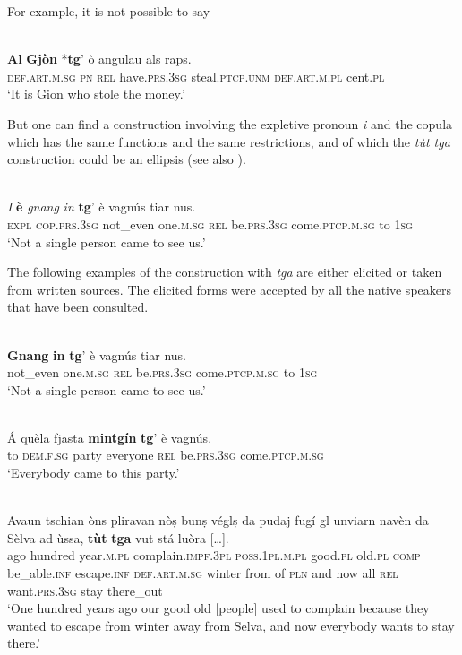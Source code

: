 For example, it is not possible to say

\ea\label{}
\\
\gll \textbf{Al} \textbf{Gjòn} *\textbf{tg}' ò angulau als raps.\\
\textsc{def.art.m.sg} \textsc{pn} \textsc{rel} have.\textsc{prs.3sg} steal.\textsc{ptcp.unm} \textsc{def.art.m.pl} cent.\textsc{pl}\\
\glt `It is Gion who stole the money.'
\z

But one can find a construction involving the expletive pronoun \textit{i} and the copula which has the same functions and the same restrictions, and of which the \textit{tùt tga} construction could be an ellipsis (see also  \citet[201]{Linder1987}).

\ea\label{}
\\
\gll \textit{I} \textbf{è} \textit{gnang} \textit{in} \textbf{tg}' è vagnús tiar nus.\\
\textsc{expl} \textsc{cop.prs.3sg} not\_even one.\textsc{m.sg} \textsc{rel} be.\textsc{prs.3sg} come.\textsc{ptcp.m.sg} to \textsc{1sg}\\
\glt `Not a single person came to see us.'
\z

The following examples of the construction with \textit{tga} are either elicited or taken from written sources. The elicited forms were accepted by all the native speakers that have been consulted.

\ea
\label{}
\\
\gll \textbf{Gnang} \textbf{in} \textbf{tg}' è vagnús tiar nus.\\
not\_even one.\textsc{m.sg} \textsc{rel} be.\textsc{prs.3sg} come.\textsc{ptcp.m.sg} to \textsc{1sg}\\
\glt `Not a single person came to see us.'
\z

\ea
\label{}
\\
\gll Á quèla fjasta \textbf{mintgín} \textbf{tg}' è vagnús.   \\
to \textsc{dem.f.sg} party everyone \textsc{rel} be.\textsc{prs.3sg} come.\textsc{ptcp.m.sg} \\
\glt `Everybody came to this party.'
\z

\ea
\label{}
\\
\gll  Avaun tschian òns pliravan nòṣ bunṣ véglṣ da pudaj fugí gl unviarn navèn da Sèlva ad ùssa, \textbf{tùt} \textbf{tga} vut stá luòra […].\\
ago hundred year.\textsc{m.pl} complain.\textsc{impf.3pl} \textsc{poss.1pl.m.pl} good.\textsc{pl} old.\textsc{pl} \textsc{comp} be\_able.\textsc{inf} escape.\textsc{inf} \textsc{def.art.m.sg} winter from of \textsc{pln} and now all \textsc{rel} want.\textsc{prs.3sg} stay there\_out \\
\glt `One hundred years ago our good old [people] used to complain because they wanted to escape from winter away from Selva, and now everybody wants to stay there.'
\z

